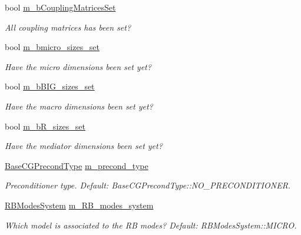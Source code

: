 \begin{DoxyCompactItemize}
bool \hyperlink{classcarl_1_1_f_e_t_i___operations_a135e27fab9922c0343b09e0c98112c8c}{m\+\_\+b\+Coupling\+Matrices\+Set}
\begin{DoxyCompactList}\small\item\em All coupling matrices has been set? \end{DoxyCompactList}\item 
bool \hyperlink{classcarl_1_1_f_e_t_i___operations_aa3daef2d7401e0988cdea89f7ae31869}{m\+\_\+bmicro\+\_\+sizes\+\_\+set}
\begin{DoxyCompactList}\small\item\em Have the micro dimensions been set yet? \end{DoxyCompactList}\item 
bool \hyperlink{classcarl_1_1_f_e_t_i___operations_a03d5022fa7da0e04b60c59c3d3cd598a}{m\+\_\+b\+B\+I\+G\+\_\+sizes\+\_\+set}
\begin{DoxyCompactList}\small\item\em Have the macro dimensions been set yet? \end{DoxyCompactList}\item 
bool \hyperlink{classcarl_1_1_f_e_t_i___operations_a353b1739899d3d0260b97132603dbe02}{m\+\_\+b\+R\+\_\+sizes\+\_\+set}
\begin{DoxyCompactList}\small\item\em Have the mediator dimensions been set yet? \end{DoxyCompactList}\item 
\hyperlink{namespacecarl_ad52f21755b51ffa926038b59ae194ea8}{Base\+C\+G\+Precond\+Type} \hyperlink{classcarl_1_1_f_e_t_i___operations_a76e474f6c1b8bb99cee6a6645f15b25b}{m\+\_\+precond\+\_\+type}
\begin{DoxyCompactList}\small\item\em Preconditioner type. {\itshape Default}\+: {\ttfamily Base\+C\+G\+Precond\+Type\+::\+N\+O\+\_\+\+P\+R\+E\+C\+O\+N\+D\+I\+T\+I\+O\+N\+E\+R}. \end{DoxyCompactList}\item 
\hyperlink{namespacecarl_a356b58f8ae262a4fd4359f513c1aaf44}{R\+B\+Modes\+System} \hyperlink{classcarl_1_1_f_e_t_i___operations_a1ca335075ea08144dd5756ad5969cb08}{m\+\_\+\+R\+B\+\_\+modes\+\_\+system}
\begin{DoxyCompactList}\small\item\em Which model is associated to the R\+B modes? {\itshape Default}\+: {\ttfamily R\+B\+Modes\+System\+::\+M\+I\+C\+R\+O}. \end{DoxyCompactList}\item 

\end{DoxyCompactItemize}
